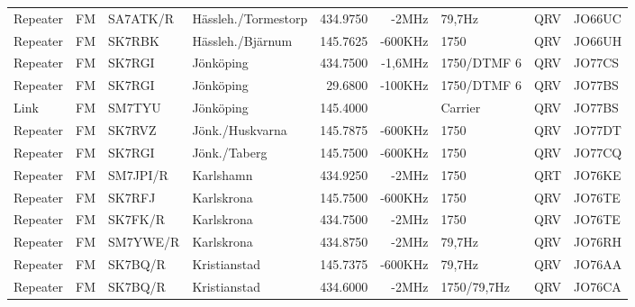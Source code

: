 \begin{landscape}
\begin{longtable}{llllrrlcl}
	Repeater          & FM           & SA7ATK/R      & Hässleh./Tormestorp &          434.9750 &          -2MHz & 79,7Hz          &       QRV       & JO66UC           \\
	Repeater          & FM           & SK7RBK        & Hässleh./Bjärnum    &          145.7625 &        -600KHz & 1750            &       QRV       & JO66UH           \\
	Repeater          & FM           & SK7RGI        & Jönköping           &          434.7500 &        -1,6MHz & 1750/DTMF 6     &       QRV       & JO77CS           \\
	Repeater          & FM           & SK7RGI        & Jönköping           &           29.6800 &        -100KHz & 1750/DTMF 6     &       QRV       & JO77BS           \\
	Link              & FM           & SM7TYU        & Jönköping           &          145.4000 &                & Carrier         &       QRV       & JO77BS           \\
	Repeater          & FM           & SK7RVZ        & Jönk./Huskvarna     &          145.7875 &        -600KHz & 1750            &       QRV       & JO77DT           \\
	Repeater          & FM           & SK7RGI        & Jönk./Taberg        &          145.7500 &        -600KHz & 1750            &       QRV       & JO77CQ           \\
	Repeater          & FM           & SM7JPI/R      & Karlshamn           &          434.9250 &          -2MHz & 1750            &       QRT       & JO76KE           \\
	Repeater          & FM           & SK7RFJ        & Karlskrona          &          145.7500 &        -600KHz & 1750            &       QRV       & JO76TE           \\
	Repeater          & FM           & SK7FK/R       & Karlskrona          &          434.7500 &          -2MHz & 1750            &       QRV       & JO76TE           \\
	Repeater          & FM           & SM7YWE/R      & Karlskrona          &          434.8750 &          -2MHz & 79,7Hz          &       QRV       & JO76RH           \\
	Repeater          & FM           & SK7BQ/R       & Kristianstad        &          145.7375 &        -600KHz & 79,7Hz          &       QRV       & JO76AA           \\
	Repeater          & FM           & SK7BQ/R       & Kristianstad        &          434.6000 &          -2MHz & 1750/79,7Hz     &       QRV       & JO76CA           \\

\end{longtable}
\end{landscape}
